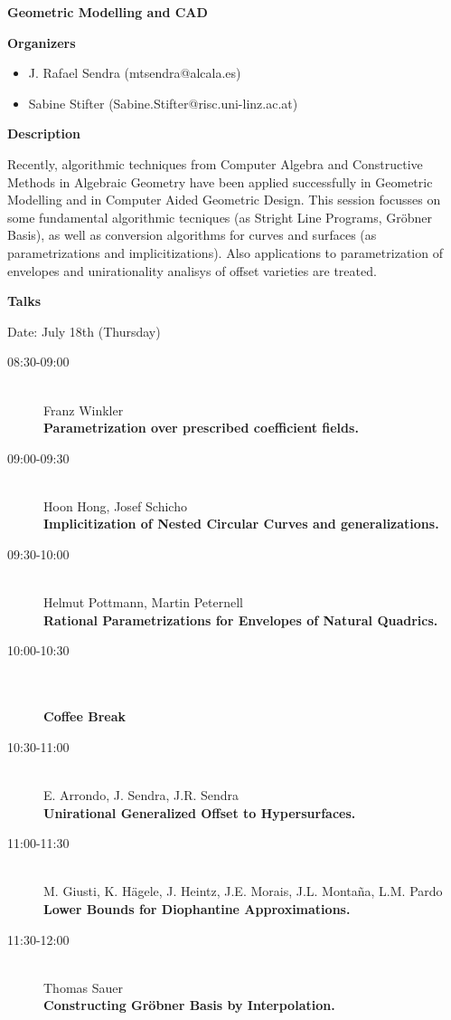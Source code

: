 \begin{center}
{\LARGE \bf Geometric Modelling and CAD}
\end{center}
\bigskip

\noindent
{\bf Organizers}
\begin{itemize}
\item
J. Rafael Sendra (mtsendra@alcala.es)


\item
Sabine Stifter (Sabine.Stifter@risc.uni-linz.ac.at)

\end{itemize}
\medskip

\bigskip

\noindent
{\bf Description}
\medskip

Recently, algorithmic techniques from Computer Algebra and Constructive Methods in Algebraic
Geometry have been applied successfully in Geometric Modelling and in Computer Aided
Geometric Design. This session focusses on some fundamental algorithmic tecniques (as Stright
Line Programs, Gr\"obner Basis), as well as conversion algorithms for curves and surfaces (as
parametrizations and implicitizations). Also applications to parametrization of envelopes and
unirationality analisys of offset varieties are treated. 

\bigskip
\noindent
{\bf Talks}
\medskip

Date: July 18th (Thursday) 

\begin{description}
\item[08:30-09:00] \ \\
  Franz Winkler\\
  {\bf Parametrization over prescribed coefficient fields.
} 
\item[09:00-09:30] \ \\
  Hoon Hong, Josef Schicho
\\
  {\bf Implicitization of Nested Circular Curves and generalizations.
} 
\item[09:30-10:00] \ \\
  Helmut Pottmann, Martin Peternell
\\
  {\bf Rational Parametrizations for Envelopes of Natural Quadrics.
} 
\item[10:00-10:30] \ \\
  \\
  {\bf Coffee Break 
} 
\item[10:30-11:00] \ \\
  E. Arrondo, J. Sendra, J.R. Sendra\\
  {\bf Unirational Generalized Offset to Hypersurfaces.
} 
\item[11:00-11:30] \ \\
  M. Giusti, K. H\"agele, J. Heintz, J.E. Morais, J.L. Monta\~na, L.M. Pardo
\\
  {\bf Lower Bounds for Diophantine Approximations.
} 
\item[11:30-12:00] \ \\
  Thomas Sauer\\
  {\bf Constructing Gr\"obner Basis by Interpolation.
} 
\end{description}

